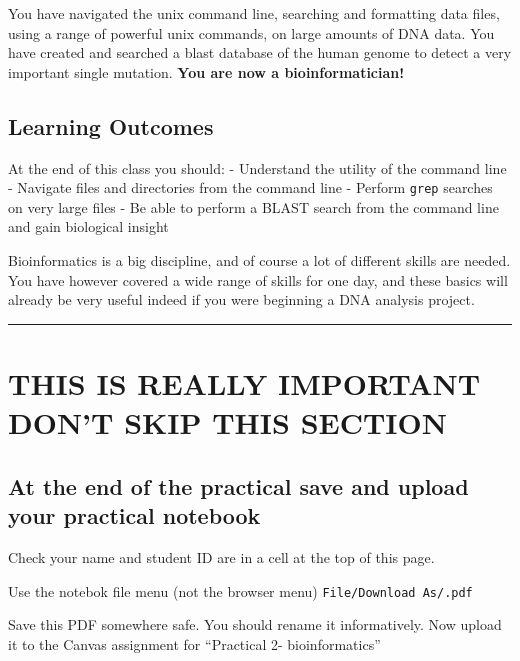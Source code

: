 \documentclass[11pt]{article}
\begin{document}
You have navigated the unix command line, searching and formatting data
files, using a range of powerful unix commands, on large amounts of DNA
data. You have created and searched a blast database of the human genome
to detect a very important single mutation. \textbf{You are now a
bioinformatician!}

    \hypertarget{learning-outcomes}{%
\subsection{Learning Outcomes}\label{learning-outcomes}}

At the end of this class you should: - Understand the utility of the
command line - Navigate files and directories from the command line -
Perform \texttt{grep} searches on very large files - Be able to perform
a BLAST search from the command line and gain biological insight

Bioinformatics is a big discipline, and of course a lot of different
skills are needed. You have however covered a wide range of skills for
one day, and these basics will already be very useful indeed if you were
beginning a DNA analysis project.

    \begin{center}\rule{0.5\linewidth}{\linethickness}\end{center}

\hypertarget{this-is-really-important-dont-skip-this-section}{%
\section{THIS IS REALLY IMPORTANT DON'T SKIP THIS
SECTION}\label{this-is-really-important-dont-skip-this-section}}

\hypertarget{at-the-end-of-the-practical-save-and-upload-your-practical-notebook}{%
\subsection{At the end of the practical save and upload your practical
notebook}\label{at-the-end-of-the-practical-save-and-upload-your-practical-notebook}}

Check your name and student ID are in a cell at the top of this page.

Use the notebok file menu (not the browser menu)
\texttt{File/Download\ As/.pdf}

Save this PDF somewhere safe. You should rename it informatively. Now
upload it to the Canvas assignment for ``Practical 2- bioinformatics''
\end{document}
